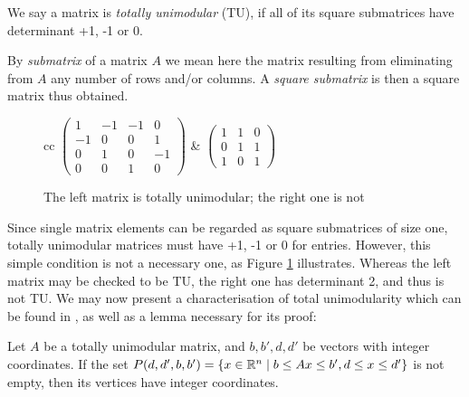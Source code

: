 \begin{definition}
    \label{def:total-unimodularity}
    
    We say a matrix is \emph{totally unimodular} (TU), if all of its square
    submatrices have determinant +1, -1 or 0.
\end{definition}

By \emph{submatrix} of a matrix $A$ we mean here the matrix resulting from
eliminating from $A$ any number of rows and/or columns. A \emph{square
submatrix} is then a square matrix thus obtained.

\begin{figure}
    \centering
    \begin{tabular}{cc}
        \(
            \begin{pmatrix}
                 1 & -1 & -1 &  0\\
                -1 &  0 &  0 &  1\\
                 0 &  1 &  0 & -1\\
                 0 &  0 &  1 &  0
            \end{pmatrix}
        \)
        \quad
        &
        \quad
        \(
            \begin{pmatrix}
                1 & 1 & 0\\
                0 & 1 & 1\\
                1 & 0 & 1
            \end{pmatrix}
        \)
    \end{tabular}
    \caption{The left matrix is totally unimodular; the right one is not}
    \label{fig:tu-matrices}
\end{figure}

Since single matrix elements can be regarded as square submatrices of size one,
totally unimodular matrices must have +1, -1 or 0 for entries. However, this
simple condition is not a necessary one, as Figure \ref{fig:tu-matrices}
illustrates. Whereas the left matrix may be checked to be TU, the right one has
determinant 2, and thus is not TU. We may now present a characterisation of
total unimodularity which can be found in \cite{ne:opt}, as well as a lemma
necessary for its proof:

\begin{lemma}
    \label{lem:tu-lemma}
    
    Let $A$ be a totally unimodular matrix, and $b, b', d, d'$ be vectors with
    integer coordinates. If the set
    $
        P(d, d', b, b')
            = \{ x \in {\ensuremath{\mathbb{R}}}^n \mid b \leq Ax \leq b', d \leq x \leq d' \}
    $
    is not empty, then its vertices have integer coordinates.
\end{lemma}

